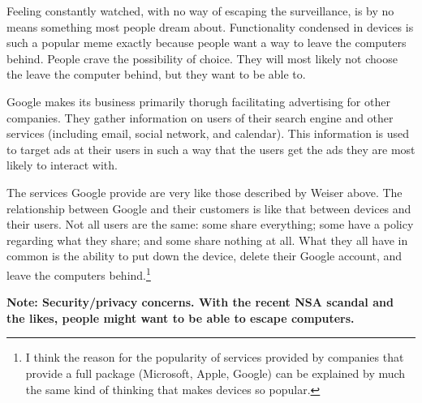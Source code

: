 Feeling constantly watched, with no way of escaping the surveillance, is by no means something most people dream about.
Functionality condensed in devices is such a popular meme exactly because people want a way to leave the computers behind.
People crave the possibility of choice. They will most likely not choose the leave the computer behind, but they want to
be able to.

Google makes its business primarily thorugh facilitating advertising for other companies. They gather information on users of
their search engine and other services (including email, social network, and calendar). This information is used to target ads
at their users in such a way that the users get the ads they are most likely to interact with.

The services Google provide are very like those described by Weiser above. The relationship between Google and their customers
is like that between devices and their users. Not all users are the same: some share everything; some have a policy regarding
what they share; and some share nothing at all. What they all have in common is the ability to put down the device, delete their
Google account, and leave the computers behind.\footnote{I think the reason for the popularity of services provided by companies
that provide a full package (Microsoft, Apple, Google) can be explained by much the same kind of thinking that makes devices so
popular.}

\textbf{Note: Security/privacy concerns. With the recent NSA scandal and the likes, people might want to be able to escape computers.}